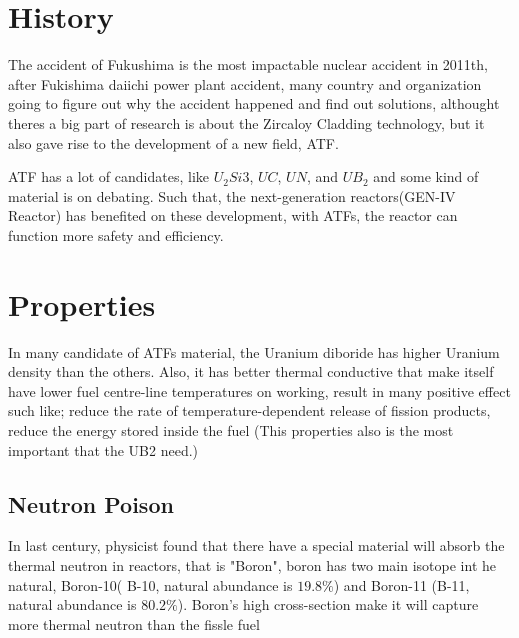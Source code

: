 \documentclass[final,10pt,times,twocolumn]{elsarticle}
\begin{document}
\section{History}
The accident of Fukushima is the most impactable nuclear accident in 2011th, after Fukishima daiichi power plant accident, many country and organization going to figure out why the accident happened and find out solutions, althought theres a big part of research is about the Zircaloy Cladding technology, but it also gave rise to the development of a new field, ATF.

ATF has a lot of candidates, like $U_{2}Si{3}$, $UC$, $UN$, and $UB_{2}$ and some kind of material is on debating. Such that, the next-generation reactors(GEN-IV Reactor) has benefited on these development, with ATFs, the reactor can function more safety and efficiency.

\section{Properties}
In many candidate of ATFs material, the Uranium diboride has higher Uranium density than the others. Also, it has better thermal conductive that make itself have lower fuel centre-line temperatures on working, result in many positive effect such like; reduce the rate of temperature-dependent release of fission products, reduce the energy stored inside the fuel (This properties also is the most important that the UB2 need.)

\subsection{Neutron Poison}
In last century, physicist found that there have a special material will absorb the thermal neutron in reactors, that is "Boron", boron has two main isotope int he natural, Boron-10( B-10, natural abundance is $19.8\%$) and Boron-11 (B-11, natural abundance is $80.2\%$). Boron's high cross-section make it will capture more thermal neutron than the fissle fuel



\end{document}
